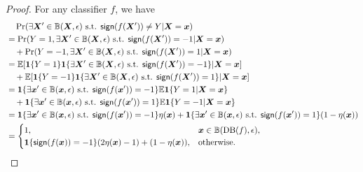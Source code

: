 \documentclass[11pt]{article}
\newcommand{\sign}{\textup{\textsf{sign}}}
\newcommand{\boundary}{\mathrm{DB}}
\newcommand{\x}{\bm{x}}
\newcommand{\X}{\bm{X}}
\newcommand{\0}{\mathbf{0}}
\newcommand{\1}{\mathbf{1}}
\newcommand{\bbB}{\mathbb{B}}
\newcommand{\bbE}{\mathbb{E}}
\begin{document}
\begin{proof}
For any classifier $f$, we have
\begin{equation*}
\begin{split}
&\quad \Pr(\exists \X'\in\bbB(\X,\epsilon) \text{ s.t. } \sign(f(\X'))\not=Y|\X=\x)\\
&=\Pr(Y=1,\exists \X'\in\bbB(\X,\epsilon) \text{ s.t. }\sign(f(\X'))=-1|\X=\x)\\
&\quad+\Pr(Y=-1,\exists \X'\in\bbB(\X,\epsilon) \text{ s.t. }\sign(f(\X'))=1|\X=\x)\\
&=\bbE[\1\{Y=1\}\1\{\exists \X'\in\bbB(\X,\epsilon) \text{ s.t. }\sign(f(\X'))=-1\}|\X=\x]\\
&\quad +\bbE[\1\{Y=-1\}\1\{\exists \X'\in\bbB(\X,\epsilon) \text{ s.t. }\sign(f(\X'))=1\}|\X=\x]\\
&=\1\{\exists \x'\in\bbB(\x,\epsilon) \text{ s.t. }\sign(f(\x'))=-1\}\bbE\1\{Y=1|\X=\x\}\\
&\quad+\1\{\exists \x'\in\bbB(\x,\epsilon) \text{ s.t. }\sign(f(\x'))=1\}\bbE\1\{Y=-1|\X=\x\}\\
&=\1\{\exists \x'\in\bbB(\x,\epsilon) \text{ s.t. }\sign(f(\x'))=-1\}\eta(\x)+\1\{\exists \x'\in\bbB(\x,\epsilon) \text{ s.t. }\sign(f(\x'))=1\}(1-\eta(\x))\\
&=
\begin{cases}
1, & \x\in \bbB(\boundary(f),\epsilon),\\
\1\{\sign(f(\x))=-1\}(2\eta(\x)-1)+(1-\eta(\x)), & \text{otherwise}.
\end{cases}
\end{split}
\end{equation*}


\end{proof}
\end{document}
